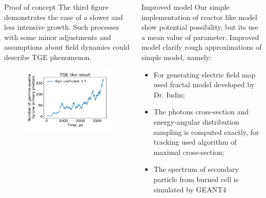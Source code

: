 \documentclass[final,hyperref={pdfpagelabels=false}]{beamer}
\begin{document}
\begin{frame}{}
\begin{columns}[t]
\begin{column}{0.32\linewidth}
\begin{block}{Proof of concept}
                The third figure demonstrates the case of a slower and less intensive growth. Such processes with some minor adjustments and assumptions about field dynamics could describe TGE phenomenon.
				\begin{figure}[htb]
					\centering
					\includegraphics[width=1\columnwidth]{proofTGE.pdf}
				\end{figure}
			\end{block}
			                
			
			                
		\end{column}%
		            
		\begin{column}{0.32\linewidth}
			                
			\begin{block}{Improved model}
                Our simple implementation of reactor like model show potential possibility, but its use a mean value of parameter. 
				Improved model clarify  rough approximations of simple model, namely:
				\begin{itemize}
					\item For generating electric field map used fractal model developed by Dr. Iudin; ~\cite{Iudin:2018}
					\item The photons cross-section and energy-angular distribution sampling  is computed exactly, for tracking used algorithm of maximal cross-section;
					\item The spectrum of secondary particle from burned cell is simulated by GEANT4~\cite{ALLISON2016186}
					

\end{itemize}
\end{block}
\end{column}
\end{columns}
\end{frame}
\end{document}
